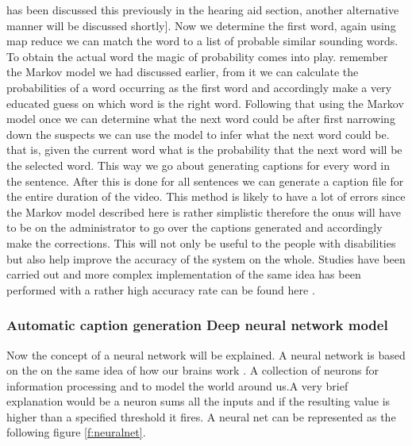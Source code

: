 \documentclass[sigconf]{acmart}
\begin{document}
has been discussed this previously in the hearing aid section, another alternative manner will be discussed shortly]. Now we determine the first word, again using map reduce we can match the word to a list of probable similar sounding words. To obtain the actual word the magic of probability comes into play. remember the Markov model we had discussed earlier, from it we can calculate the probabilities of a word occurring as the first word and accordingly make a very educated guess on which word is the right word. Following that using the Markov model once we can determine what the next word could be after first narrowing down the suspects we can use the model to infer what the next word could be. that is, given the current word what is the probability that the next word will be the selected word. \newline
This way we go about generating captions for every word in the sentence. After this is done for all sentences we can generate a caption file for the entire duration of the video. This method is likely to have a lot of errors since the Markov model described here is rather simplistic therefore the onus will have to be on the administrator to go over the captions generated and accordingly make the corrections. This will not only be useful to the people with disabilities but also help improve the accuracy of the system on the whole. Studies have been carried out and more complex implementation of the same idea has been performed with a rather high accuracy rate can be found here \cite{Hakkani-Tur2017}.
\newline
\subsubsection{Automatic caption generation Deep neural network model}
Now the concept of a neural network will be explained. A neural network is based on the on the same idea of how our brains work \cite{wikip[edia2017} . A collection of neurons for information processing and to model the world around us.A very brief explanation would be a neuron sums all the inputs and if the resulting value is higher than a specified threshold it fires. A neural net can be represented as the following figure \ref{f:neuralnet}.
\end{document}
